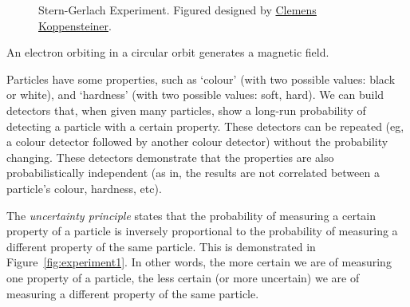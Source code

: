 \begin{figure}[htp]
\caption{Stern-Gerlach Experiment. Figured designed by \href{http://clemens.koppensteiner.site}{Clemens Koppensteiner}.}\label{fig:stern_gerlach}\end{figure}
\begin{note}
    An electron orbiting in a circular orbit generates a magnetic field.
\end{note}
Particles have some properties, such as `colour' (with two possible values: black or white), and `hardness' (with two possible values: soft, hard). We can build detectors that, when given many particles, show a long-run probability of detecting a particle with a certain property. These detectors can be repeated (eg, a colour detector followed by another colour detector) without the probability changing. These detectors demonstrate that the properties are also probabilistically independent (as in, the results are not correlated between a particle's colour, hardness, etc).

\begin{definition}
    The \emph{uncertainty principle} states that the probability of measuring a certain property of a particle is inversely proportional to the probability of measuring a different property of the same particle. This is demonstrated in Figure~\ref{fig:experiment1}. In other words, the more certain we are of measuring one property of a particle, the less certain (or more uncertain) we are of measuring a different property of the same particle.
\end{definition}

